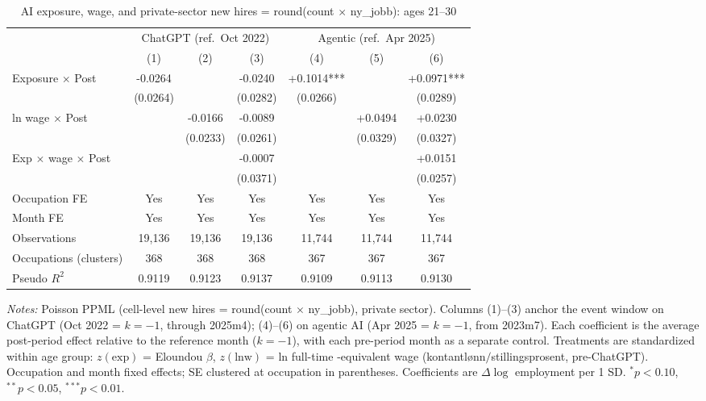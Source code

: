 \begin{table}[htbp]\centering
\caption{AI exposure, wage, and private-sector new hires = round(count $\times$ ny\_jobb): ages 21–30}
\label{tab:ca_did_age1}
\small
\begin{tabular}{lcccccc}
\toprule
 & \multicolumn{3}{c}{ChatGPT (ref.\ Oct 2022)} & \multicolumn{3}{c}{Agentic (ref.\ Apr 2025)} \\
\cmidrule(lr){2-4} \cmidrule(lr){5-7}
 & (1) & (2) & (3) & (4) & (5) & (6) \\
\midrule
Exposure $\times$ Post & -0.0264 &  & -0.0240 & +0.1014*** &  & +0.0971*** \\
 & (0.0264) &  & (0.0282) & (0.0266) &  & (0.0289) \\
ln wage $\times$ Post &  & -0.0166 & -0.0089 &  & +0.0494 & +0.0230 \\
 &  & (0.0233) & (0.0261) &  & (0.0329) & (0.0327) \\
Exp $\times$ wage $\times$ Post &  &  & -0.0007 &  &  & +0.0151 \\
 &  &  & (0.0371) &  &  & (0.0257) \\
\midrule
Occupation FE & Yes & Yes & Yes & Yes & Yes & Yes \\
Month FE & Yes & Yes & Yes & Yes & Yes & Yes \\
Observations & 19,136 & 19,136 & 19,136 & 11,744 & 11,744 & 11,744 \\
Occupations (clusters) & 368 & 368 & 368 & 367 & 367 & 367 \\
Pseudo $R^2$ & 0.9119 & 0.9123 & 0.9137 & 0.9109 & 0.9113 & 0.9130 \\
\bottomrule
\end{tabular}
\begin{minipage}{\linewidth}\vspace{2pt}\footnotesize
\emph{Notes:} Poisson PPML (cell-level new hires = round(count $\times$ ny\_jobb), private sector). Columns (1)--(3) anchor the event window on ChatGPT (Oct 2022 = $k{=}{-}1$, through 2025m4); (4)--(6) on agentic AI (Apr 2025 = $k{=}{-}1$, from 2023m7). Each coefficient is the average post-period effect relative to the reference month ($k{=}{-}1$), with each pre-period month as a separate control. Treatments are standardized within age group: $z(\text{exp})$ = Eloundou $\beta$, $z(\text{lnw})$ = ln full-time -equivalent wage (kontantl\o nn$/$stillingsprosent, pre-ChatGPT). Occupation and month fixed effects; SE clustered at occupation in parentheses. Coefficients are $\Delta\log$ employment per 1 SD. $^{*}p<0.10$, $^{**}p<0.05$, $^{***}p<0.01$.
\end{minipage}
\end{table}